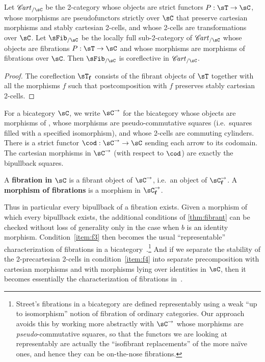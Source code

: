 \documentclass{amsart}
\def\sCart{\ensuremath{\mathscr{C}\!\mathit{art}\xspace}}
\def\f{_{\mathbf{f}}}
\begin{document}
\begin{thm}\label{thm:fibrant-corefl}
  Let $\sCart_{/\sC}$ be the 2-category whose objects are strict functors $P:\sT\to\sC$, whose morphisms are pseudofunctors strictly over $\sC$ that preserve cartesian morphisms and stably cartesian 2-cells, and whose 2-cells are transformations over $\sC$.
  Let $\sFib_{/\sC}$ be the locally full sub-2-category of $\sCart_{/\sC}$ whose objects are fibrations $P:\sT\to\sC$ and whose morphisms are morphisms of fibrations over $\sC$.
  Then $\sFib_{/\sC}$ is coreflective in $\sCart_{/\sC}$.
\end{thm}
\begin{proof}
  The coreflection $\sT\f$ consists of the fibrant objects of $\sT$ together with all the morphisms $f$ such that postcomposition with $f$ preserves stably cartesian 2-cells.
\end{proof}

For a bicategory $\sC$, we write $\sC^\to$ for the bicategory whose objects are morphisms of \sC, whose morphisms are pseudo-commutative squares (i.e.\ squares filled with a specified isomorphism), and whose 2-cells are commuting cylinders.
There is a strict functor $\cod : \sC^\to\to\sC$ sending each arrow to its codomain.
The cartesian morphisms in $\sC^\to$ (with respect to $\cod$) are exactly the bipullback squares.

\begin{defn}
  A \textbf{fibration in $\sC$} is a fibrant object of $\sC^\to$, i.e.\ an object of $\sC^\to\f$.
  A \textbf{morphism of fibrations} is a morphism in $\sC^\to\f$.
\end{defn}

Thus in particular every bipullback of a fibration exists.
Given a morphism of which every bipullback exists, the additional conditions of \cref{thm:fibrant} can be checked without loss of generality only in the case when $b$ is an identity morphism.
Condition~\ref{item:f3} then becomes the usual ``representable'' characterization of fibrations in a bicategory~\cite{street:fibi,street:conspectus}.\footnote{Street's fibrations in a bicategory are defined representably using a weak ``up to isomorphism'' notion of fibration of ordinary categories.
Our approach avoids this by working more abstractly with $\sC^\to$ whose morphisms are \emph{pseudo}-commutative squares, so that the functors we are looking at representably are actually the ``isofibrant replacements'' of the more na\"ive ones, and hence they can be on-the-nose fibrations.}
And if we separate the stability of the 2-precartesian 2-cells in condition~\ref{item:f4} into separate precomposition with cartesian morphisms and with morphisms lying over identities in $\sC$, then it becomes essentially the characterization of fibrations in~\cite{ptj:fib-pprod}.
\end{document}
